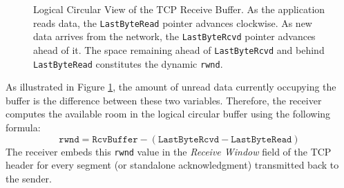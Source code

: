 \begin{figure}[htbp]
    \centering
    \caption{Logical Circular View of the TCP Receive Buffer. As the application reads data, the \texttt{LastByteRead} pointer advances clockwise. As new data arrives from the network, the \texttt{LastByteRcvd} pointer advances ahead of it. The space remaining ahead of \texttt{LastByteRcvd} and behind \texttt{LastByteRead} constitutes the dynamic \texttt{rwnd}.}
    \label{fig:tcp_logical_circular_buffer}
\end{figure}

As illustrated in Figure \ref{fig:tcp_logical_circular_buffer}, the amount of unread data currently occupying the buffer is the difference between these two variables. Therefore, the receiver computes the available room in the logical circular buffer using the following formula:
\[
\texttt{rwnd} = \texttt{RcvBuffer} - (\texttt{LastByteRcvd} - \texttt{LastByteRead})
\]
The receiver embeds this \texttt{rwnd} value in the \emph{Receive Window} field of the TCP header for every segment (or standalone acknowledgment) transmitted back to the sender.

